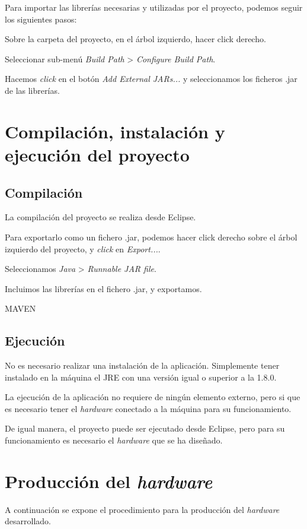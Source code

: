 Para importar las librerías necesarias y utilizadas por el proyecto, podemos seguir los siguientes pasos:

Sobre la carpeta del proyecto, en el árbol izquierdo, hacer click derecho.

Seleccionar sub-menú \emph{Build Path} > \emph{Configure Build Path}.

Hacemos \emph{click} en el botón \emph{Add External JARs...} y seleccionamos los ficheros .jar de las librerías.


\section{Compilación, instalación y ejecución del proyecto}


\subsection{Compilación}
La compilación del proyecto se realiza desde Eclipse. 

Para exportarlo como un fichero .jar, podemos hacer click derecho sobre el árbol izquierdo del proyecto, y \emph{click} en \emph{Export...}.

Seleccionamos \emph{Java} > \emph{Runnable JAR file}.

Incluimos las librerías en el fichero .jar, y exportamos.

MAVEN

\subsection{Ejecución}

No es necesario realizar una instalación de la aplicación. Simplemente tener instalado en la máquina el JRE con una versión igual o superior a la 1.8.0.

La ejecución de la aplicación no requiere de ningún elemento externo, pero si que es necesario tener el \emph{hardware} conectado a la máquina para su funcionamiento.

De igual manera, el proyecto puede ser ejecutado desde Eclipse, pero para su funcionamiento es necesario el \emph{hardware} que se ha diseñado.

\section{Producción del \emph{hardware}}

A continuación se expone el procedimiento para la producción del \emph{hardware} desarrollado.

